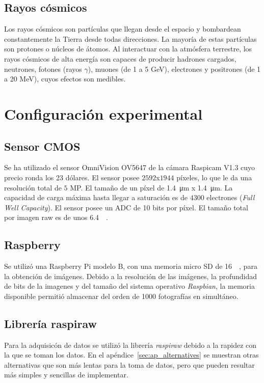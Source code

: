 \documentclass[twoside,twocolumn]{article}
\begin{document}
    \subsection{Rayos cósmicos}\label{sec:intro:cosmic_ray}
      Los rayos cósmicos son partículas que llegan desde el espacio y bombardean constantemente la Tierra desde todas direcciones.
      La mayoría de estas partículas son protones o núcleos de átomos.
      Al interactuar con la atmósfera terrestre, los rayos cósmicos de alta energía
      son capaces de producir hadrones cargados, neutrones, fotones (rayos $\gamma$),
      muones (de 1 a 5 \si{\giga \eV}), electrones y positrones (de 1 a 20 \si{\mega \eV}), \cite{GriederCRAE}
      cuyos efectos son medibles.
  

  \section{Configuración experimental}\label{sec:conf_exp}

    \subsection{Sensor CMOS}\label{sec:conf_exp:CMOS}
      Se ha utilizado el sensor OmniVision OV5647 de la cámara Raspicam V1.3 cuyo precio ronda los 23 dólares.
      El sensor posee	$2592$x$1944$ píxeles, lo que le da una resolución total de $5$ MP.
      El tamaño de un píxel de \SI{1.4}{\micro\meter} x \SI{1.4}{\micro\meter}.
      La capacidad de carga máxima hasta llegar a saturación es de $4300$ electrones (\emph{Full Well Capacity}).
      El sensor posee un ADC de 10 bits por píxel.
      El tamaño total por imagen raw es de unos \SI{6.4}{\mega\byte}.

    \subsection{Raspberry}\label{sec:conf_exp:raspberry}
      Se utilizó una Raspberry Pi modelo B, con una memoria micro SD de \SI{16}{\giga\byte}, para la obtención de imágenes.
      Debido a la resolución de las imágenes, la profundidad de bits de la imagenes y del tamaño del sistema operativo \emph{Raspbian}, 
      la memoria disponible permitió almacenar del orden de 1000 fotografías en simultáneo.

    \subsection{Librería raspiraw}\label{sec:conf_exp:raspiraw}
      Para la adquisicón de datos se utilizó la librería {\it raspiraw}\cite{raspiraw} debido a la rapidez con la que se toman los datos.
      En el apéndice~\ref{sec:ap_alternatives} se muestran otras alternativas que son más lentas para la toma de datos,
      pero que pueden resultar más simples y sencillas de implementar.
\end{document}
